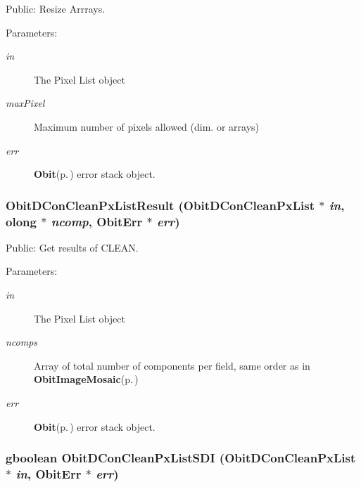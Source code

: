 Public: Resize Arrrays. 

\begin{Desc}
\item[Parameters:]
\begin{description}
\item[{\em in}]The Pixel List object \item[{\em max\-Pixel}]Maximum number of pixels allowed (dim. or arrays) \item[{\em err}]{\bf Obit}{\rm (p.\,\pageref{structObit})} error stack object. \end{description}
\end{Desc}
\subsubsection{ Obit\-DCon\-Clean\-Px\-List\-Result ({\bf Obit\-DCon\-Clean\-Px\-List} $\ast$ {\em in}, {\bf olong} $\ast$ {\em ncomp}, {\bf Obit\-Err} $\ast$ {\em err})}\label{ObitDConCleanPxList_8c_a21}


Public: Get results of CLEAN. 

\begin{Desc}
\item[Parameters:]
\begin{description}
\item[{\em in}]The Pixel List object \item[{\em ncomps}]Array of total number of components per field, same order as in {\bf Obit\-Image\-Mosaic}{\rm (p.\,\pageref{structObitImageMosaic})} \item[{\em err}]{\bf Obit}{\rm (p.\,\pageref{structObit})} error stack object. \end{description}
\end{Desc}
\subsubsection{\setlength{\rightskip}{0pt plus 5cm}gboolean Obit\-DCon\-Clean\-Px\-List\-SDI ({\bf Obit\-DCon\-Clean\-Px\-List} $\ast$ {\em in}, {\bf Obit\-Err} $\ast$ {\em err})}\label{ObitDConCleanPxList_8c_a20}


